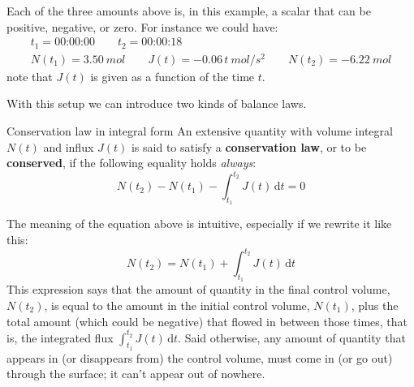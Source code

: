\documentclass[a4paper,12pt,%
onecolumn,oneside,titlepage,%
british%
]{memoir}
\renewcommand*{\bm}[1]{\textpdfrender{TextRenderingMode=2,LineWidth=0.3pt}{\boldsymbol{#1}}}
\newcommand*{\di}{\mathrm{d}}%
\renewcommand*{\|}[1][]{\nonscript\:#1\vert\nonscript\:\mathopen{}}
\newcommand*{\yN}{N}
\newcommand*{\yJ}{J}
\begin{document}
Each of the three amounts above is, in this example, a scalar that can be positive, negative, or zero. For instance we could have:
\begin{equation*}
  \begin{gathered}
    t_{1} = \text{00:00:00}
    \qquad t_{2} = \text{00:00:18}
    \\ \yN(t_{1}) = \qty{3.50}{mol}
    \qquad \yJ(t) = -0.06\,t\:\unit{mol/s^{2}}
    \qquad \yN(t_{2}) = \qty{-6.22}{mol}
  \end{gathered}
\end{equation*}
note that $\yJ(t)$ is given as a function of the time $t$.


\smallskip

With this setup we can introduce two kinds of balance laws.

\begin{definition}{Conservation law in integral form}
  An extensive quantity with volume integral $\yN(t)$ and influx $\yJ(t)$ is said to satisfy a \textbf{conservation law}, or to be \textbf{conserved}, if the following equality holds \emph{always}:
  \begin{equation}
    \label{eq:conserved}
    \yN(t_{2}) - \yN(t_{1}) - \int_{t_{1}}^{t_{2}}\!\!\yJ(t)\, \di t = 0
  \end{equation}
\end{definition}
The meaning of the equation above is intuitive, especially if we rewrite it like this:
\begin{equation*}
      \yN(t_{2}) = \yN(t_{1}) + \int_{t_{1}}^{t_{2}}\!\!\yJ(t)\, \di t
\end{equation*}
This expression says that the amount of quantity in the final control volume, $\yN(t_{2})$, is equal to the amount in the initial control volume, $\yN(t_{1})$, plus the total amount (which could be negative) that flowed in between those times, that is, the integrated flux $\int_{t_{1}}^{t_{2}}\!\!\yJ(t)\, \di t$. Said otherwise, any amount of quantity that appears in (or disappears from) the control volume, must come in (or go out) through the surface; it can't appear out of nowhere.
\end{document}
